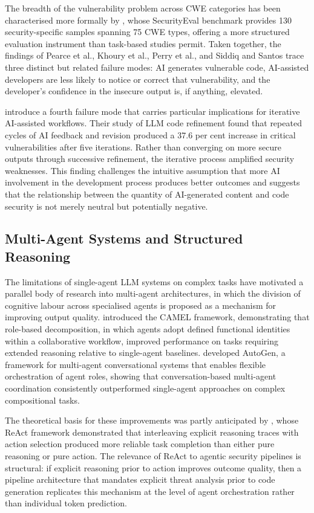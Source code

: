 The breadth of the vulnerability problem across CWE categories has been characterised more formally by \citet{siddiq2022}, whose SecurityEval benchmark provides 130 security-specific samples spanning 75 CWE types, offering a more structured evaluation instrument than task-based studies permit. Taken together, the findings of Pearce et al., Khoury et al., Perry et al., and Siddiq and Santos trace three distinct but related failure modes: AI generates vulnerable code, AI-assisted developers are less likely to notice or correct that vulnerability, and the developer's confidence in the insecure output is, if anything, elevated.

\citet{shukla2025} introduce a fourth failure mode that carries particular implications for iterative AI-assisted workflows. Their study of LLM code refinement found that repeated cycles of AI feedback and revision produced a 37.6 per cent increase in critical vulnerabilities after five iterations. Rather than converging on more secure outputs through successive refinement, the iterative process amplified security weaknesses. This finding challenges the intuitive assumption that more AI involvement in the development process produces better outcomes and suggests that the relationship between the quantity of AI-generated content and code security is not merely neutral but potentially negative.

\subsection{Multi-Agent Systems and Structured Reasoning}

The limitations of single-agent LLM systems on complex tasks have motivated a parallel body of research into multi-agent architectures, in which the division of cognitive labour across specialised agents is proposed as a mechanism for improving output quality. \citet{li2023camel} introduced the CAMEL framework, demonstrating that role-based decomposition, in which agents adopt defined functional identities within a collaborative workflow, improved performance on tasks requiring extended reasoning relative to single-agent baselines. \citet{wu2023autogen} developed AutoGen, a framework for multi-agent conversational systems that enables flexible orchestration of agent roles, showing that conversation-based multi-agent coordination consistently outperformed single-agent approaches on complex compositional tasks.

The theoretical basis for these improvements was partly anticipated by \citet{yao2023}, whose ReAct framework demonstrated that interleaving explicit reasoning traces with action selection produced more reliable task completion than either pure reasoning or pure action. The relevance of ReAct to agentic security pipelines is structural: if explicit reasoning prior to action improves outcome quality, then a pipeline architecture that mandates explicit threat analysis prior to code generation replicates this mechanism at the level of agent orchestration rather than individual token prediction.

